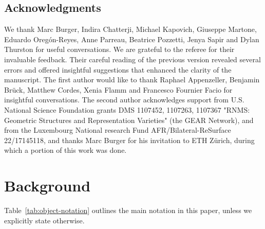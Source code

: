 \documentclass[12pt,article]{amsart}
\numberwithin{equation}{section}
\numberwithin{figure}{section}
\theoremstyle{definition}
\theoremstyle{plain}
\begin{document}
\subsection{Acknowledgments}


\label{sec:acknowledgments}

We thank Marc Burger, Indira Chatterji, Michael Kapovich, Giuseppe Martone, Eduardo Oreg\'on-Reyes, Anne Parreau, Beatrice Pozzetti, Jenya Sapir and Dylan Thurston for useful conversations.
We are grateful to the referee for their invaluable feedback. Their careful reading of the previous version revealed several errors and offered insightful suggestions that enhanced the clarity of the manuscript.
The first author would like to thank Raphael Appenzeller, Benjamin Br\"uck, Matthew Cordes, Xenia Flamm and Francesco Fournier Facio for insightful conversations.
The second author acknowledges support from U.S. National Science Foundation grants DMS 1107452, 1107263, 1107367 "RNMS: Geometric Structures and Representation Varieties" (the GEAR Network), and from the Luxembourg National research Fund AFR/Bilateral-ReSurface 22/17145118, and thanks Marc Burger for his invitation to ETH Z\"urich, during which a portion of this work was done. 

\section{Background}
\label{sec:background}

Table~\ref{tab:object-notation} outlines the main notation in this paper, unless we explicitly state otherwise.
\end{document}
